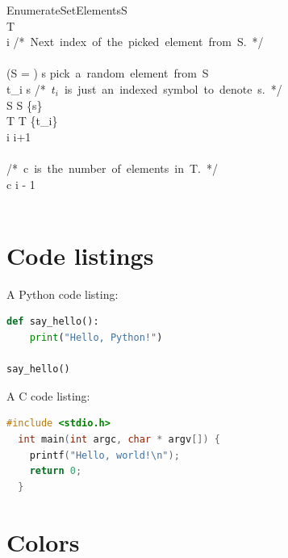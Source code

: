 \documentclass[12pt, letterpaper, oneside]{article}
\begin{document}
\begin{pseudocode}[ruled]{EnumerateSetElements}{S}
   \\
  T \GETS \emptyset \\
  i  \mbox{/* Next index of the picked element from S. */} \\
  \\
  \WHILE \NOT (S = \emptyset) \DO
  \BEGIN
  s \GETS \mbox{pick a random element from S} \\
  t_i \GETS s \mbox{/* $t_i$ is just an indexed symbol to denote s. */} \\
  S \GETS S \setminus \{s\} \\
  T \GETS T \cup \{t_i\} \\
  i \GETS i+1
  \END \\
  \\
  \mbox{/* c is the number of elements in T. */} \\
  c \GETS i - 1 \\
  \\
\end{pseudocode}

\section{Code listings}

A Python code listing:

\begin{lstlisting}[language=Python]
def say_hello():
    print("Hello, Python!")

say_hello()
\end{lstlisting}

A C code listing:

\begin{lstlisting}[language=C]
  #include <stdio.h>
  int main(int argc, char * argv[]) {
    printf("Hello, world!\n");
    return 0;
  }
\end{lstlisting}

\section{Colors}
\end{document}
